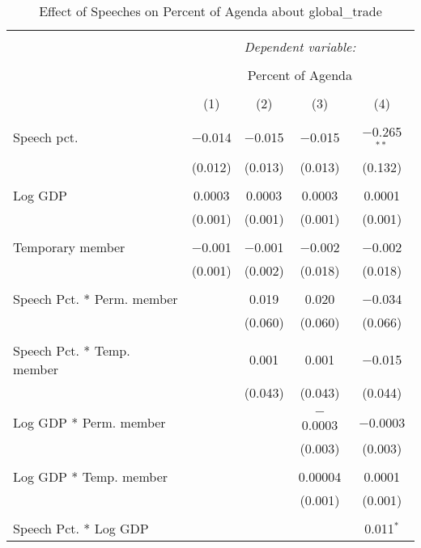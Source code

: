 
\begin{table}[!htbp] \centering 
  \caption{Effect of Speeches on Percent of Agenda about  global_trade} 
  \label{} 
\begin{tabular}{@{\extracolsep{5pt}}lcccc} 
\\[-1.8ex]\hline 
\hline \\[-1.8ex] 
 & \multicolumn{4}{c}{\textit{Dependent variable:}} \\ 
\cline{2-5} 
\\[-1.8ex] & \multicolumn{4}{c}{Percent of Agenda} \\ 
\\[-1.8ex] & (1) & (2) & (3) & (4)\\ 
\hline \\[-1.8ex] 
 Speech pct. & $-$0.014 & $-$0.015 & $-$0.015 & $-$0.265$^{**}$ \\ 
  & (0.012) & (0.013) & (0.013) & (0.132) \\ 
  & & & & \\ 
 Log GDP & 0.0003 & 0.0003 & 0.0003 & 0.0001 \\ 
  & (0.001) & (0.001) & (0.001) & (0.001) \\ 
  & & & & \\ 
 Temporary member & $-$0.001 & $-$0.001 & $-$0.002 & $-$0.002 \\ 
  & (0.001) & (0.002) & (0.018) & (0.018) \\ 
  & & & & \\ 
 Speech Pct. * Perm. member &  & 0.019 & 0.020 & $-$0.034 \\ 
  &  & (0.060) & (0.060) & (0.066) \\ 
  & & & & \\ 
 Speech Pct. * Temp. member &  & 0.001 & 0.001 & $-$0.015 \\ 
  &  & (0.043) & (0.043) & (0.044) \\ 
  & & & & \\ 
 Log GDP * Perm. member &  &  & $-$0.0003 & $-$0.0003 \\ 
  &  &  & (0.003) & (0.003) \\ 
  & & & & \\ 
 Log GDP * Temp. member &  &  & 0.00004 & 0.0001 \\ 
  &  &  & (0.001) & (0.001) \\ 
  & & & & \\ 
 Speech Pct. * Log GDP &  &  &  & 0.011$^{*}$ \\ 

\end{tabular}
\end{table}

